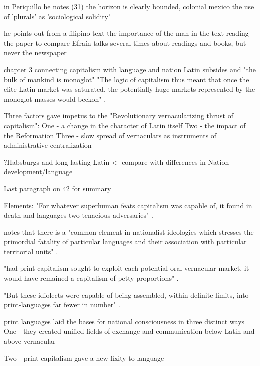 \documentclass[12pt]{article}
\begin{document}
in Periquillo he notes (31)
the horizon is clearly bounded, colonial mexico
the use of 'plurals' as 'sociological solidity'

he points out from a filipino text the importance of the man in the text reading the paper
to compare Efraín talks several times about readings and books, but never the newspaper

chapter 3
connecting capitalism with language and nation
Latin subsides and "the bulk of mankind is monoglot"
"The logic of capitalism thus meant that once the elite Latin market was saturated, the potentially huge markets represented by the monoglot masses would beckon" \cite[38]{Anderson2006}.

Three factors gave impetus to the "Revolutionary vernacularizing thrust of capitalism":
One - a change in the character of Latin itself
Two - the impact of the Reformation
Three - slow spread of vernaculars as instruments of administrative centralization

?Habsburgs and long lasting Latin <- compare with differences in Nation development/language

Last paragraph on 42 for summary 

Elements:
"For whatever superhuman feats capitalism was capable of, it found in death and languages two tenacious adversaries" \cite[43]{Anderson2006}.

notes that there is a "common element in nationalist ideologies which stresses the primordial fatality of particular languages and their association with particular territorial units" \cite[43]{Anderson2006}.

"had print capitalism sought to exploit each potential oral vernacular market, it would have remained a capitalism of petty proportions" \cite[43]{Anderson2006}.

"But these idiolects were capable of being assembled, within definite limits, into print-languages far fewer in number" \cite[43]{Anderson2006}.

print languages laid the bases for national consciousness in three distinct ways
One - they created unified fields of exchange and communication below Latin and above vernacular

Two - print capitalism gave a new fixity to language
\end{document}
